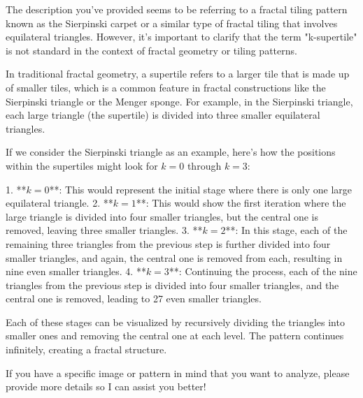 The description you've provided seems to be referring to a fractal tiling pattern known as the Sierpinski carpet or a similar type of fractal tiling that involves equilateral triangles. However, it's important to clarify that the term "k-supertile" is not standard in the context of fractal geometry or tiling patterns.

In traditional fractal geometry, a supertile refers to a larger tile that is made up of smaller tiles, which is a common feature in fractal constructions like the Sierpinski triangle or the Menger sponge. For example, in the Sierpinski triangle, each large triangle (the supertile) is divided into three smaller equilateral triangles.

If we consider the Sierpinski triangle as an example, here’s how the positions within the supertiles might look for \( k = 0 \) through \( k = 3 \):

1. **\( k = 0 \)**: This would represent the initial stage where there is only one large equilateral triangle.
2. **\( k = 1 \)**: This would show the first iteration where the large triangle is divided into four smaller triangles, but the central one is removed, leaving three smaller triangles.
3. **\( k = 2 \)**: In this stage, each of the remaining three triangles from the previous step is further divided into four smaller triangles, and again, the central one is removed from each, resulting in nine even smaller triangles.
4. **\( k = 3 \)**: Continuing the process, each of the nine triangles from the previous step is divided into four smaller triangles, and the central one is removed, leading to 27 even smaller triangles.

Each of these stages can be visualized by recursively dividing the triangles into smaller ones and removing the central one at each level. The pattern continues infinitely, creating a fractal structure.

If you have a specific image or pattern in mind that you want to analyze, please provide more details so I can assist you better!